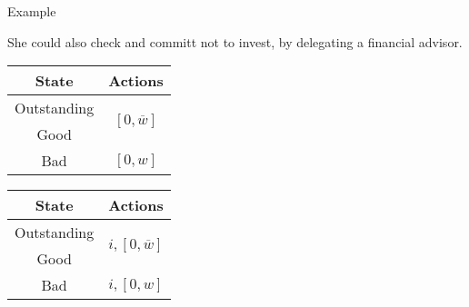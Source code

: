 \documentclass[usenames,dvipsnames,aspectratio=169,11pt, envcountsect, handout]{beamer}
\begin{document}
\begin{frame}{Example}

	She could also check and committ not to invest, by delegating a financial advisor.

	\vfill

	\begin{table}[H]
		\centering
		\begin{minipage}{0.29\textwidth}
			\centering
			\begin{tabular}{c | c}
				State                             & Actions                                                                    \\
				\hline
				{\color{bleudefrance}Outstanding} & \multirow{2}{*}{{\color{bleudefrance}\( \left[0, \overline{w} \right] \)}} \\
				{\color{bleudefrance}Good}        &                                                                            \\
				Bad                               & \( \left[0, w \right]\)                                                    \\
			\end{tabular}
			\vspace{0.5cm} %
		\end{minipage}\hspace{0.5cm} %
		\begin{minipage}{0.29\textwidth}
			\centering
			\begin{tabular}{c | c}
				State                             & Actions                                                                        \\
				\hline
				{\color{bleudefrance}Outstanding} & \multirow{2}{*}{{\color{bleudefrance}\( i, \left[ 0, \overline{w} \right] \)}} \\
				{\color{bleudefrance}Good}        &                                                                                \\
				Bad                               & \(  i, \left[0, w \right] \)                                                   \\
			\end{tabular}
			\vspace{0.5cm} %
		\end{minipage}\hspace{0.5cm} %

\end{table}
\end{frame}
\end{document}
